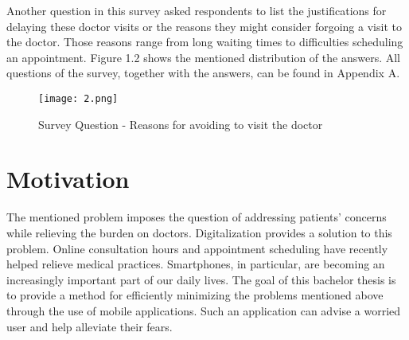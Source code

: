 \noindent 
Another question in this survey asked respondents to list the justifications for delaying these doctor visits or the reasons they might consider forgoing a visit to the doctor. Those reasons range from long waiting times to difficulties scheduling an appointment. Figure 1.2 shows the mentioned distribution of the answers. All questions of the survey, together with the answers, can be found in Appendix A.
\begin{figure}[H]
	\centering
	\texttt{[image: 2.png]}
	\caption[Survey Question]{Survey Question - Reasons for avoiding to visit the doctor}
\end{figure}
\noindent 

\section{Motivation}
The mentioned problem imposes the question of addressing patients' concerns while relieving the burden on doctors. Digitalization provides a solution to this problem. Online consultation hours and appointment scheduling have recently helped relieve medical practices. Smartphones, in particular, are becoming an increasingly important part of our daily lives. The goal of this bachelor thesis is to provide a method for efficiently minimizing the problems mentioned above through the use of mobile applications. Such an application can advise a worried user and help alleviate their fears.

